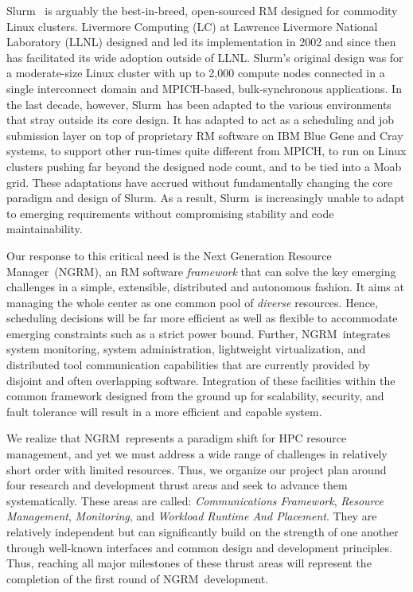 \documentclass[10pt]{article}
\newif\ifcomments
\newcommand{\ngrm}{NGRM}
\newcommand{\ngrmfull}{Next Generation Resource Manager}
\newcommand{\slurm}{Slurm}
\newcommand{\moab}{Moab}
\begin{document}
\ifcomments
\marginpar{\tiny {\bf ned-review:} Citation needed.
As above, we need more than anecdotal evidence that Slurm can't meet future
requirements.}
\fi
\slurm~\cite{SlurmDesign} is arguably the
best-in-breed, open-sourced RM designed for commodity Linux clusters.
Livermore Computing (LC) at Lawrence Livermore National Laboratory (LLNL)
designed and led its implementation in 2002 and since then has facilitated
its wide adoption outside of LLNL.
\slurm's original design was for a moderate-size Linux cluster with up to 2,000 
compute nodes connected in a single interconnect domain and MPICH-based, 
bulk-synchronous applications.
In the last decade, however, \slurm\ has been adapted to the various
environments that stray outside its core design.
It has adapted to act as a scheduling and job submission layer
on top of proprietary RM software on IBM Blue Gene and Cray systems,
to support other run-times quite different from MPICH,
to run on Linux clusters pushing far beyond the designed node count,
and to be tied into a \moab~\cite{MOAB:online} grid.
These adaptations have accrued without fundamentally changing the
core paradigm and design of \slurm. As a result, \slurm\ is increasingly
unable to adapt to emerging requirements without compromising
stability and code maintainability.

Our response to this critical need is the \ngrmfull\ (\ngrm ), an RM software
{\em framework} that can solve the key emerging challenges 
in a simple, extensible, distributed and autonomous fashion.
It aims at managing the whole center as one common pool of {\em diverse} 
resources. Hence, scheduling decisions will be 
far more efficient as well as flexible to accommodate 
emerging constraints such as a strict power bound. 
Further, \ngrm\ integrates
system monitoring, system administration, lightweight
virtualization, and distributed tool communication capabilities
that are currently provided by disjoint and often overlapping software.
Integration of these facilities within the common framework designed from
the ground up for scalability, security, and fault tolerance will result
in a more efficient and capable system.

\ifcomments
\marginpar{\tiny {\bf ned-review:}
What about the security model--should it be its own thrust area?  It seems to me
a  robust security model will need to be incorporated from the ground up, so it
should be one of the first things we work on.
{\bf jg:} Security model is developed in comms thrust.}
\fi
We realize that \ngrm\ represents a paradigm shift for HPC resource management, 
and yet we must address a wide range of challenges in relatively short order
with limited resources. Thus, we 
organize our project plan around four research and development thrust areas 
and seek to advance them systematically.
These areas are called:
{\em Communications Framework},
{\em Resource Management},
{\em Monitoring}, and
{\em Workload Runtime And Placement}.
They are relatively independent but can significantly build on the
strength of one another through well-known interfaces and common design
and development principles.
Thus, reaching all major milestones of these thrust areas 
will represent the completion of the first round of \ngrm\ development. 
\end{document}
